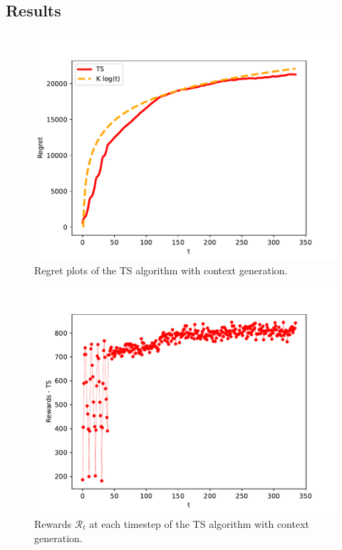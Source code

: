 \documentclass[12pt,a4paper]{report}
\begin{document}
			\subsection{Results}
\begin{figure}[H]
\centering
  \includegraphics[scale = 0.7, center]{4r}
  \caption{Regret plots of the TS algorithm with context generation.}
\end{figure}
\begin{figure}[H]
\centering
  \includegraphics[scale = 0.7, center]{4rew}
  \caption{Rewards $\mathcal R_t$ at each timestep of the TS algorithm with context generation.}
\end{figure}
\end{document}

